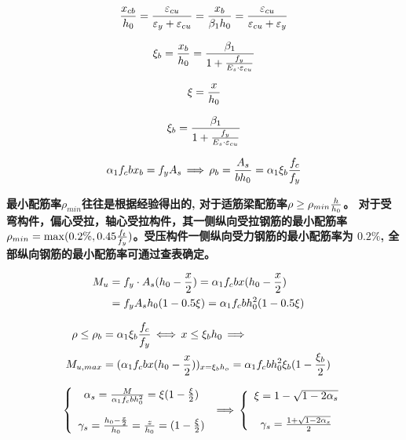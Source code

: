 \begin{align}
{x_{cb}\over h_0} = {\varepsilon_{cu}\over{\varepsilon_y}+\varepsilon_{cu}} = %
{x_b\over\beta_1h_0}={\varepsilon_{cu}\over\varepsilon_{cu} + \varepsilon_y}
\end{align}

\begin{align}
\xi_b = {x_b\over h_0} = {\beta_1\over 1 +{f_y\over{E_s\cdot\varepsilon_{cu}}}}
\end{align}

\begin{equation}
\xi = {x\over h_0}
\end{equation}

\begin{equation}
\xi_b = {\beta_1\over{1 + {f_y\over{E_s\cdot\varepsilon_{cu}}}}}
\end{equation}

\begin{align}
\alpha_1f_cbx_b= f_yA_s\,\Longrightarrow\,%
\rho_b = {A_s\over bh_0} = \alpha_1\xi_b{f_c\over f_y}
\end{align}

\vskip10pt
{\bf 最小配筋率$\rho_{min}$往往是根据经验得出的, 对于适筋梁配筋率$\rho\ge\rho_{min}{h\over h_0}$。%
    对于受弯构件，偏心受拉，轴心受拉构件，其一侧纵向受拉钢筋的最小配筋率%
$\rho_{min} = \max(0.2\%, 0.45{f_t\over f_y})$。受压构件一侧纵向受力钢筋的最小配筋率为 $0.2\%$, %
全部纵向钢筋的最小配筋率可通过查表确定。}
\vskip15pt

\begin{align}
M_u &= f_y\cdot A_s(h_0 - {x\over 2}) = \alpha_1f_c bx(h_0 - {x\over 2})\cr
&= f_yA_sh_0(1-0.5\xi) = \alpha_1f_cbh_0^2(1-0.5\xi)
\end{align}


\begin{align}
    \rho \le \rho_b &= \alpha_1\xi_b{f_c\over f_y}\,\Longleftrightarrow\, x\le \xi_bh_0\,\Longrightarrow\cr
    M_{u,max} &= (\alpha_1f_cbx(h_0-{x\over 2}))_{x={\xi_bh_o}} = \alpha_1f_cbh_0^2\xi_b(1-{\xi_b\over2})
\end{align}

\begin{align}
    \left\{\begin{array}{c}
\alpha_s = {M\over \alpha_1f_cbh_0^2} = \xi(1-{\xi\over 2})\\
~\\
\gamma_s = {h_0 - {x\over 2}\over h_0} = {z\over h_0} = (1 - {\xi\over 2})
\end{array}\right.\,\Longrightarrow\,\left\{\begin{array}{c}
\xi = 1 - \sqrt{1-2\alpha_s}\\
~\\
\gamma_s = {1 + \sqrt{1 - 2\alpha_s}\over 2}
\end{array}\right.
\end{align}

